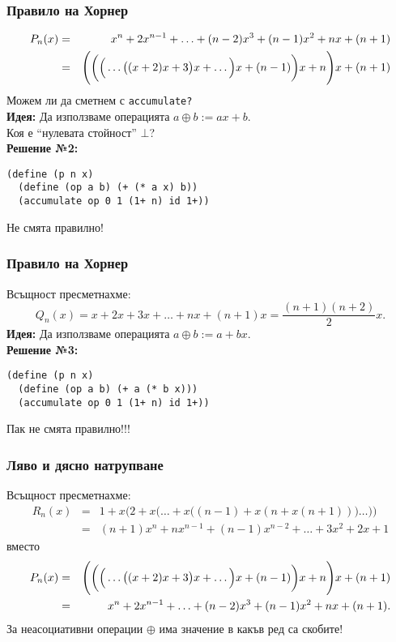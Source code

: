 \documentclass{beamer}
\begin{document}
\newcommand{\pnxh}{\Bigg(\bigg(\Big(\ldots\big((x + 2)x + 3\big)x + \ldots\Big)x + (n-1)\bigg)x + n\Bigg)x + (n+1)}

\begin{frame}[fragile]
  \frametitle{Правило на Хорнер}

  \begin{eqnarray*}
    P_n(x) &=& \pnx\\
           &=& \pnxh
  \end{eqnarray*}
  \pause
  \alert{Можем ли да сметнем с \tt{accumulate}?}\\
  \pause
  \textbf{Идея:} Да използваме операцията $a \oplus b := ax + b$.\\
  \pause
  \alert{Коя е ``нулевата стойност''  $\bot$?}\\[0.5em]
  \pause
  \textbf{Решение №2:}
\begin{lstlisting}
(define (p n x)
  (define (op a b) (+ (* a x) b))
  (accumulate op 0 1 (1+ n) id 1+))
\end{lstlisting}
  \pause
  \alert{Не смята правилно!}
\end{frame}

\begin{frame}[fragile]
  \frametitle{Правило на Хорнер}

Всъщност пресметнахме:
\begin{equation*}
  Q_n(x) = x + 2x + 3x + \ldots + nx + (n+1)x= \frac{(n+1)(n+2)}2x.
\end{equation*}
  \pause
  \textbf{Идея:} Да използваме операцията $a \oplus b := a + bx$.\\[1em]
  \pause
  \textbf{Решение №3:}
\begin{lstlisting}
(define (p n x)
  (define (op a b) (+ a (* b x)))
  (accumulate op 0 1 (1+ n) id 1+))
\end{lstlisting}
  \pause
  \alert{Пак не смята правилно!!!}
\end{frame}

\begin{frame}
  \frametitle{Ляво и дясно натрупване}

  Всъщност пресметнахме:
  \begin{eqnarray*}
    R_n(x) &=& 1+x\bigg(2+x\Big(\ldots+x\Big((n-1)+x(n+x(n+1))\Big)\ldots\Big)\bigg)\\
          &=&  (n+1)x^n + nx^{n-1} + (n-1)x^{n-2} + \ldots + 3x^2 + 2x + 1
  \end{eqnarray*}
  вместо
  \begin{eqnarray*}
    P_n(x) &=& \pnxh\\
    &=& \pnx.
  \end{eqnarray*}
  \pause
  \alert{За неасоциативни  операции $\oplus$ има значение в какъв ред са скобите!}
\end{frame}
\end{document}
